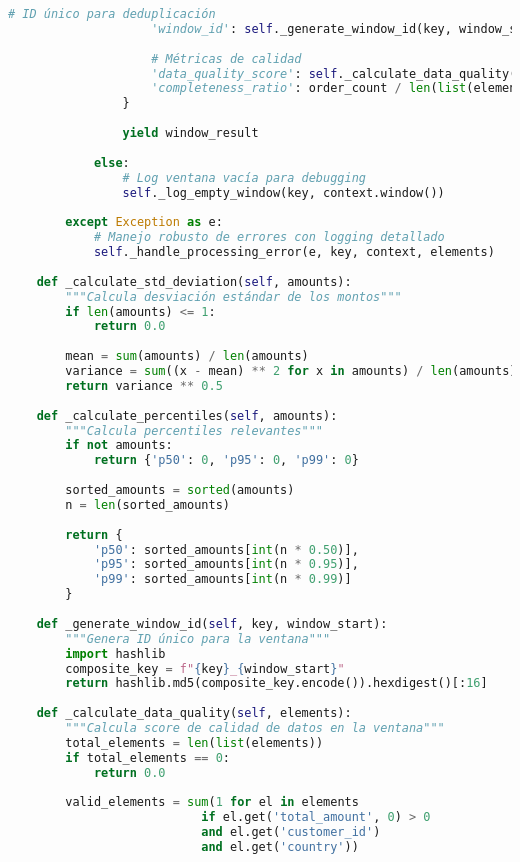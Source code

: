 \begin{lstlisting}[language=python, caption=Implementación de Procesamiento por Ventanas en PyFlink, label=lst:flink_windowing]
                    # ID único para deduplicación
                    'window_id': self._generate_window_id(key, window_start),
                    
                    # Métricas de calidad
                    'data_quality_score': self._calculate_data_quality(elements),
                    'completeness_ratio': order_count / len(list(elements))
                }
                
                yield window_result
                
            else:
                # Log ventana vacía para debugging
                self._log_empty_window(key, context.window())
                
        except Exception as e:
            # Manejo robusto de errores con logging detallado
            self._handle_processing_error(e, key, context, elements)
    
    def _calculate_std_deviation(self, amounts):
        """Calcula desviación estándar de los montos"""
        if len(amounts) <= 1:
            return 0.0
        
        mean = sum(amounts) / len(amounts)
        variance = sum((x - mean) ** 2 for x in amounts) / len(amounts)
        return variance ** 0.5
    
    def _calculate_percentiles(self, amounts):
        """Calcula percentiles relevantes"""
        if not amounts:
            return {'p50': 0, 'p95': 0, 'p99': 0}
        
        sorted_amounts = sorted(amounts)
        n = len(sorted_amounts)
        
        return {
            'p50': sorted_amounts[int(n * 0.50)],
            'p95': sorted_amounts[int(n * 0.95)],
            'p99': sorted_amounts[int(n * 0.99)]
        }
    
    def _generate_window_id(self, key, window_start):
        """Genera ID único para la ventana"""
        import hashlib
        composite_key = f"{key}_{window_start}"
        return hashlib.md5(composite_key.encode()).hexdigest()[:16]
    
    def _calculate_data_quality(self, elements):
        """Calcula score de calidad de datos en la ventana"""
        total_elements = len(list(elements))
        if total_elements == 0:
            return 0.0
        
        valid_elements = sum(1 for el in elements 
                           if el.get('total_amount', 0) > 0 
                           and el.get('customer_id')
                           and el.get('country'))
        

\end{lstlisting}
